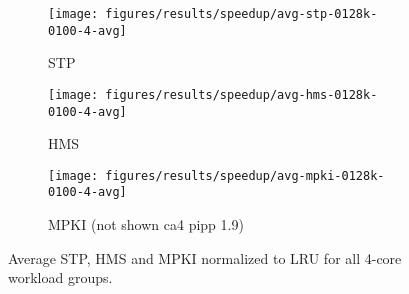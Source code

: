 \begin{figure}[th]
    \centering
    \begin{subfigure}[b]{0.6\textwidth}
        \texttt{[image: figures/results/speedup/avg-stp-0128k-0100-4-avg]}
        \caption{STP}
        \label{fig:results:base:4-avg:stp}
    \end{subfigure}
    \begin{subfigure}[b]{0.6\textwidth}
        \texttt{[image: figures/results/speedup/avg-hms-0128k-0100-4-avg]}
        \caption{HMS}
        \label{fig:results:base:4-avg:hms}
    \end{subfigure}
    \begin{subfigure}[b]{0.6\textwidth}
        \texttt{[image: figures/results/speedup/avg-mpki-0128k-0100-4-avg]}
        \caption{MPKI (not shown ca4 pipp 1.9)}
        \label{fig:results:base:4-avg:mpki}
    \end{subfigure}
    \caption[Average result for 4-core workloads]{Average STP, HMS and MPKI normalized to LRU for all 4-core workload groups.}
    \label{fig:results:base:4-avg} 
\end{figure}


